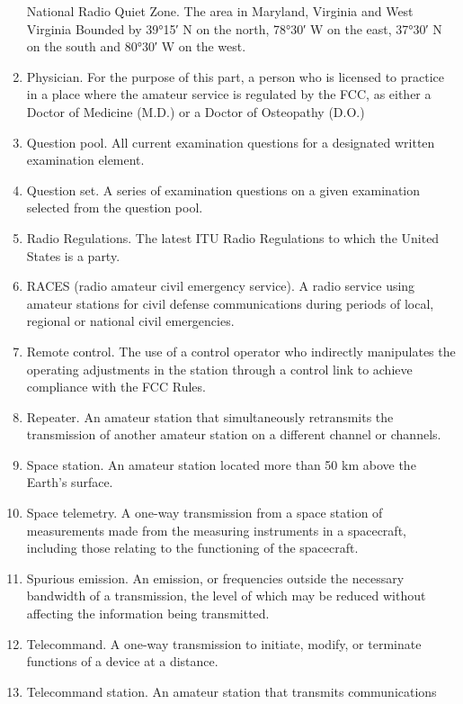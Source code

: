 \documentclass[
  letterpaper,
  DIV=11,
  numbers=noendperiod]{scrreport}
\begin{document}
\begin{enumerate}
  National Radio Quiet Zone. The area in Maryland, Virginia and West
  Virginia Bounded by 39°15′ N on the north, 78°30′ W on the east,
  37°30′ N on the south and 80°30′ W on the west.
\item
  Physician. For the purpose of this part, a person who is licensed to
  practice in a place where the amateur service is regulated by the FCC,
  as either a Doctor of Medicine (M.D.) or a Doctor of Osteopathy (D.O.)
\item
  Question pool. All current examination questions for a designated
  written examination element.
\item
  Question set. A series of examination questions on a given examination
  selected from the question pool.
\item
  Radio Regulations. The latest ITU Radio Regulations to which the
  United States is a party.
\item
  \leavevmode{}%
  RACES (radio amateur civil emergency service). A radio service using
  amateur stations for civil defense communications during periods of
  local, regional or national civil emergencies.
\item
  \leavevmode{}%
  Remote control. The use of a control operator who indirectly
  manipulates the operating adjustments in the station through a control
  link to achieve compliance with the FCC Rules.
\item
  \leavevmode{}%
  Repeater. An amateur station that simultaneously retransmits the
  transmission of another amateur station on a different channel or
  channels.
\item
  \leavevmode{}%
  Space station. An amateur station located more than 50 km above the
  Earth's surface.
\item
  Space telemetry. A one-way transmission from a space station of
  measurements made from the measuring instruments in a spacecraft,
  including those relating to the functioning of the spacecraft.
\item
  Spurious emission. An emission, or frequencies outside the necessary
  bandwidth of a transmission, the level of which may be reduced without
  affecting the information being transmitted.
\item
  Telecommand. A one-way transmission to initiate, modify, or terminate
  functions of a device at a distance.
\item
  Telecommand station. An amateur station that transmits communications

\end{enumerate}
\end{document}
